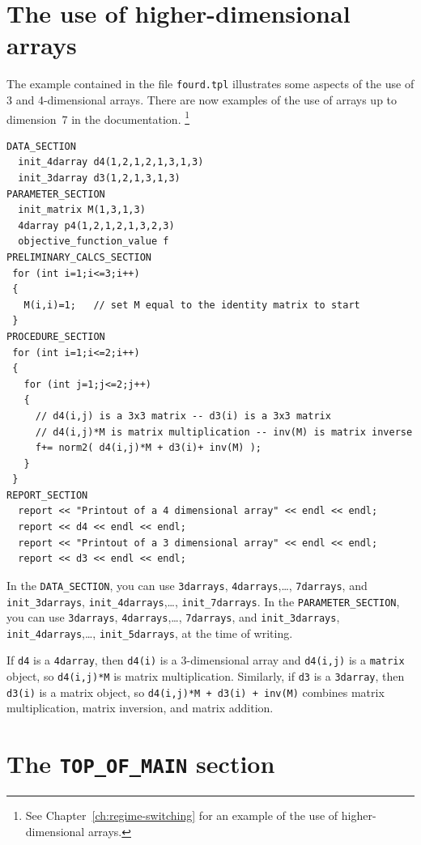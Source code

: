 \documentclass{admbmanual}
\newcommand\DS{\texttt{DATA\_SECTION}}
\newcommand\PS{\texttt{PARAMETER\_SECTION}}
\begin{document}
\section{The use of higher-dimensional arrays}

The example contained in the file \texttt{fourd.tpl} illustrates some aspects of
the use of 3 and 4-dimensional arrays. There are now examples of the use of
arrays up to dimension~7 in the documentation. \footnote{See
  Chapter~\ref{ch:regime-switching} for an example of the use of
  higher-dimensional arrays.}
\begin{lstlisting}
DATA_SECTION
  init_4darray d4(1,2,1,2,1,3,1,3)
  init_3darray d3(1,2,1,3,1,3)
PARAMETER_SECTION
  init_matrix M(1,3,1,3)
  4darray p4(1,2,1,2,1,3,2,3)
  objective_function_value f
PRELIMINARY_CALCS_SECTION
 for (int i=1;i<=3;i++)
 {
   M(i,i)=1;   // set M equal to the identity matrix to start
 }
PROCEDURE_SECTION
 for (int i=1;i<=2;i++)
 {
   for (int j=1;j<=2;j++)
   {
     // d4(i,j) is a 3x3 matrix -- d3(i) is a 3x3 matrix
     // d4(i,j)*M is matrix multiplication -- inv(M) is matrix inverse
     f+= norm2( d4(i,j)*M + d3(i)+ inv(M) );
   }
 }
REPORT_SECTION
  report << "Printout of a 4 dimensional array" << endl << endl;
  report << d4 << endl << endl;
  report << "Printout of a 3 dimensional array" << endl << endl;
  report << d3 << endl << endl;
\end{lstlisting}
In the \DS, you can use \texttt{3darrays}, \texttt{4darrays},\ldots,
\texttt{7darrays}, and \texttt{init\_3darrays}, \texttt{init\_4darrays},\ldots,
\texttt{init\_7darrays}. In the \PS, you can use \texttt{3darrays},
\texttt{4darrays},\ldots, \texttt{7darrays}, and \texttt{init\_3darrays},
\texttt{init\_4darrays},\ldots, \texttt{init\_5darrays}, at the time of writing.

If \texttt{d4} is a \texttt{4darray}, then \texttt{d4(i)} is a 3-dimensional
array and \texttt{d4(i,j)} is a \texttt{matrix} object, so \texttt{d4(i,j)*M} is
matrix multiplication. Similarly, if \texttt{d3} is a \texttt{3darray}, then
\texttt{d3(i)} is a matrix object, so \texttt{d4(i,j)*M + d3(i) + inv(M)}
combines matrix multiplication, matrix inversion, and matrix addition.


\section{The \texttt{TOP\_OF\_MAIN} section}
\end{document}
